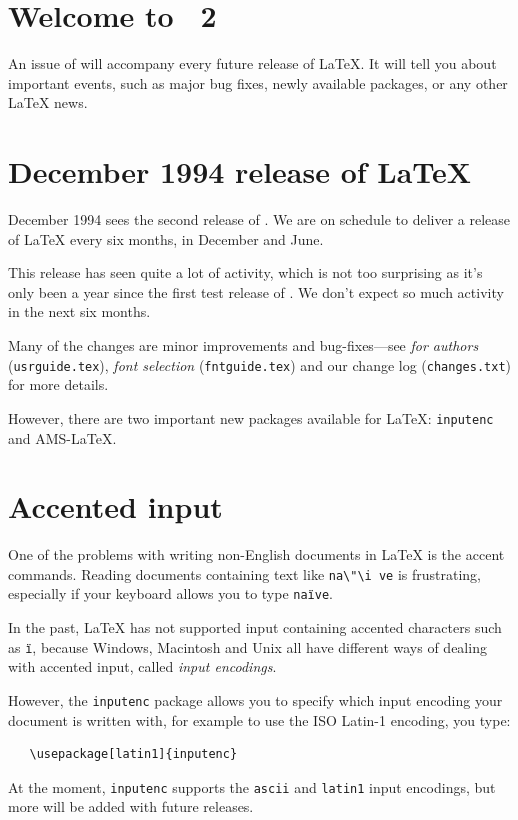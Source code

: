 \documentclass{ltnews}
\providecommand\pkg[1]{\texttt{#1}}
\begin{document}
\maketitle

\section{Welcome to \LaTeXNews~2}

An  issue of \emph{\LaTeXNews} will accompany every future release of
\LaTeX.  It will tell you about important events, such as major bug
fixes, newly available packages, or any other \LaTeX{} news.

\section{December 1994 release of \LaTeX}

December 1994 sees the second release of \LaTeXe.  We are on schedule
to deliver a release of \LaTeX{} every six months, in December and
June.

This release has seen quite a lot of activity, which is not too
surprising as it's only been a year since the first test release of
\LaTeXe.  We don't expect so much activity in the next six months.

Many of the changes are minor improvements and bug-fixes---see
\emph{\LaTeXe{} for authors} (\verb|usrguide.tex|), \emph{\LaTeXe{}
font selection} (\verb|fntguide.tex|) and our change log
(\verb|changes.txt|) for more details.

However, there are two important new packages available for \LaTeX:
\pkg{inputenc} and AMS-\LaTeX.

\section{Accented input}

One of the problems with writing non-English documents in \LaTeX{} is
the accent commands.  Reading documents containing text like
\verb|na\"\i ve| is frustrating, especially if your keyboard allows
you to type \texttt{na\"\i ve}.

In the past, \LaTeX{} has not supported input containing accented
characters such as \texttt{\"\i}, because Windows, Macintosh and Unix
all have different ways of dealing with accented input, called
\emph{input encodings}.

However, the \verb|inputenc| package allows you to specify which input
encoding your document is written with, for example to use the ISO
Latin-1 encoding, you type:
\begin{verbatim}
   \usepackage[latin1]{inputenc}
\end{verbatim}
At the moment, \verb|inputenc| supports the \verb|ascii| and
\verb|latin1| input encodings, but more will be added with future
releases.
\end{document}
